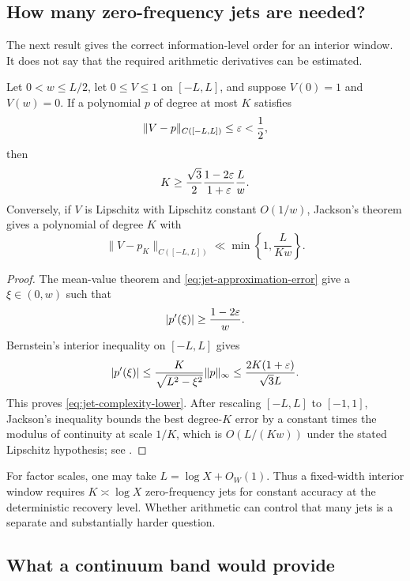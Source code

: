 \subsection{How many zero-frequency jets are needed?}

The next result gives the correct information-level order for an interior
window.  It does not say that the required arithmetic derivatives can be
estimated.

\begin{theorem}
\label{thm:jet-complexity}
Let $0<w\leq L/2$, let $0\leq V\leq1$ on $[-L,L]$, and suppose
$V(0)=1$ and $V(w)=0$.  If a polynomial $p$ of degree at most $K$ satisfies
\begin{equation}\label{eq:jet-approximation-error}
 \|V-p\|_{C([-L,L])}\leq\varepsilon<\frac12,
\end{equation}
then
\begin{equation}\label{eq:jet-complexity-lower}
 K\geq
 \frac{\sqrt3}{2}\frac{1-2\varepsilon}{1+\varepsilon}\frac{L}{w}.
\end{equation}
Conversely, if $V$ is Lipschitz with Lipschitz constant $O(1/w)$, Jackson's
theorem gives a polynomial of degree $K$ with
\begin{equation}\label{eq:jet-complexity-upper}
 \|V-p_K\|_{C([-L,L])}\ll \min\left\{1,\frac{L}{Kw}\right\}.
\end{equation}
\end{theorem}

\begin{proof}
The mean-value theorem and \eqref{eq:jet-approximation-error} give a
$\xi\in(0,w)$ such that
\[
 |p'(\xi)|\geq\frac{1-2\varepsilon}{w}.
\]
Bernstein's interior inequality on $[-L,L]$ gives
\[
 |p'(\xi)|\leq
 \frac{K}{\sqrt{L^2-\xi^2}}\|p\|_\infty
 \leq\frac{2K(1+\varepsilon)}{\sqrt3L}.
\]
This proves \eqref{eq:jet-complexity-lower}.  After rescaling
$[-L,L]$ to $[-1,1]$, Jackson's inequality bounds the best degree-$K$
error by a constant times the modulus of continuity at scale $1/K$,
which is $O(L/(Kw))$ under the stated Lipschitz hypothesis; see
\citep{Lorentz1986}.
\end{proof}

For factor scales, one may take $L=\log X+O_W(1)$.  Thus a fixed-width
interior window requires $K\asymp\log X$ zero-frequency jets for constant
accuracy at the deterministic recovery level.  Whether arithmetic can
control that many jets is a separate and substantially harder question.

\subsection{What a continuum band would provide}


